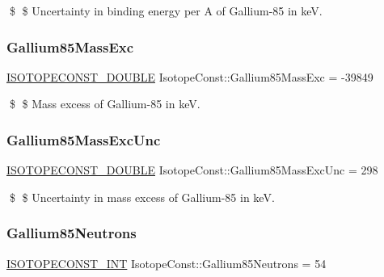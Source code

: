 \$ \$ Uncertainty in binding energy per A of Gallium-\/85 in keV. \mbox{\label{group___isotope_const-_gallium-_ga85_gaba92876772cfb97bce3132dc152c9e9a}} 
\subsubsection{\texorpdfstring{Gallium85\+Mass\+Exc}{Gallium85MassExc}}
{\footnotesize\ttfamily \mbox{\hyperlink{group___isotope_const-_macros_ga8f45a7272ce02c0b4c65c44636ed719a}{I\+S\+O\+T\+O\+P\+E\+C\+O\+N\+S\+T\+\_\+\+D\+O\+U\+B\+LE}} Isotope\+Const\+::\+Gallium85\+Mass\+Exc = -\/39849}

\$ \$ Mass excess of Gallium-\/85 in keV. \mbox{\label{group___isotope_const-_gallium-_ga85_gad8a882e8770ba6d8dc062cd3fcf8a71b}} 
\subsubsection{\texorpdfstring{Gallium85\+Mass\+Exc\+Unc}{Gallium85MassExcUnc}}
{\footnotesize\ttfamily \mbox{\hyperlink{group___isotope_const-_macros_ga8f45a7272ce02c0b4c65c44636ed719a}{I\+S\+O\+T\+O\+P\+E\+C\+O\+N\+S\+T\+\_\+\+D\+O\+U\+B\+LE}} Isotope\+Const\+::\+Gallium85\+Mass\+Exc\+Unc = 298}

\$ \$ Uncertainty in mass excess of Gallium-\/85 in keV. \mbox{\label{group___isotope_const-_gallium-_ga85_ga7f22026bec78dc5ca5fdcc0950bacb85}} 
\subsubsection{\texorpdfstring{Gallium85\+Neutrons}{Gallium85Neutrons}}
{\footnotesize\ttfamily \mbox{\hyperlink{group___isotope_const-_macros_ga5f18360b3e99483a35c32d789e62621c}{I\+S\+O\+T\+O\+P\+E\+C\+O\+N\+S\+T\+\_\+\+I\+NT}} Isotope\+Const\+::\+Gallium85\+Neutrons = 54}

